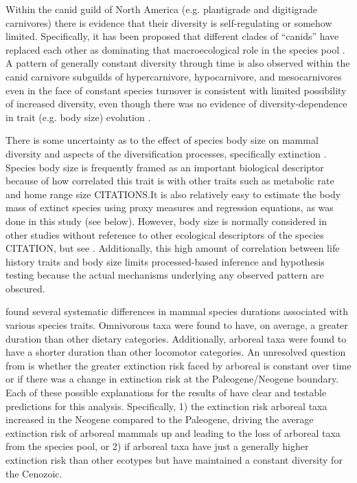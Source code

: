 \documentclass[12pt,letterpaper]{article}
\begin{document}
Within the canid guild of North America (e.g. plantigrade and digitigrade carnivores) there is evidence that their diversity is self-regulating or somehow limited. Specifically, it has been proposed that different clades of ``canids'' have replaced each other as dominating that macroecological role in the species pool \citep{Silvesto2015b}. A pattern of generally constant diversity through time is also observed within the canid carnivore subguilds of hypercarnivore, hypocarnivore, and mesocarnivores even in the face of constant species turnover is consistent with limited possibility of increased diversity, even though there was no evidence of diversity-dependence in trait (e.g. body size) evolution \citep{Slater2015c}.

There is some uncertainty as to the effect of species body size on mammal diversity and aspects of the diversification processes, specifically extinction \citep{Liow2008,Liow2009,Tomiya2013,Smits2015b}. Species body size is frequently framed as an important biological descriptor because of how correlated this trait is with other traits such as metabolic rate and home range size CITATIONS.It is also relatively easy to estimate the body mass of extinct species using proxy measures and regression equations, as was done in this study (see below). However, body size is normally considered in other studies without reference to other ecological descriptors of the species CITATION, but see \citep{Smits2015}. Additionally, this high amount of correlation between life history traits and body size limits processed-based inference and hypothesis testing because the actual mechanisms underlying any observed pattern are obscured.

\citet{Smits2015b} found several systematic differences in mammal species durations associated with various species traits. Omnivorous taxa were found to have, on average, a greater duration than other dietary categories. Additionally, arboreal taxa were found to have a shorter duration than other locomotor categories. An unresolved question from \citet{Smits2015b} is whether the greater extinction risk faced by arboreal is constant over time or if there was a change in extinction risk at the Paleogene/Neogene boundary. Each of these possible explanations for the results of \citet{Smits2015} have clear and testable predictions for this analysis. Specifically, 1) the extinction risk arboreal taxa increased in the Neogene compared to the Paleogene, driving the average extinction risk of arboreal mammals up and leading to the loss of arboreal taxa from the species pool, or 2) if arboreal taxa have just a generally higher extinction risk than other ecotypes but have maintained a constant diversity for the Cenozoic. 
\end{document}
